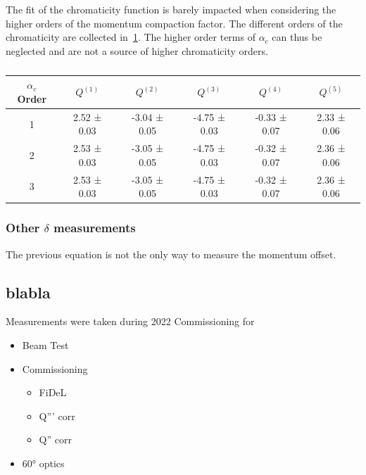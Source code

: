 The fit of the chromaticity function is barely impacted when considering the higher orders of the 
momentum compaction factor. The different orders of the chromaticity are collected
in~\cref{table:decapoles:chromaticity:alpha_c_chroma}.
The higher order terms of $\alpha_c$ can thus be neglected and are not a source of higher
chromaticity orders.

\begin{table}[tbh]
    \begin{tabular}{c|ccccc}
        $\alpha_c$ Order & $Q^{(1)}$ & $Q^{(2)}$ & $Q^{(3)}$ & $Q^{(4)}$ & $Q^{(5)}$\\
        \hline
        1 & 2.52 ± 0.03 & -3.04 ± 0.05 & -4.75 ± 0.03 & -0.33 ± 0.07 & 2.33 ± 0.06 \\
        2 & 2.53 ± 0.03 & -3.05 ± 0.05 & -4.75 ± 0.03 & -0.32 ± 0.07 & 2.36 ± 0.06 \\
        3 & 2.53 ± 0.03 & -3.05 ± 0.05 & -4.75 ± 0.03 & -0.32 ± 0.07 & 2.36 ± 0.06 \\
        \end{tabular}
    \caption{}
    \label{table:decapoles:chromaticity:alpha_c_chroma}
\end{table}


\subsubsection{Other $\delta$ measurements}

The previous equation is not the only way to measure the momentum offset.
\\


\subsection{blabla}

Measurements were taken during 2022 Commissioning for 
\begin{itemize}
    \item Beam Test
    \item Commissioning
    \begin{itemize}
        \item FiDeL
        \item Q''' corr
        \item Q'' corr
    \end{itemize}
    \item 60° optics
\end{itemize}

